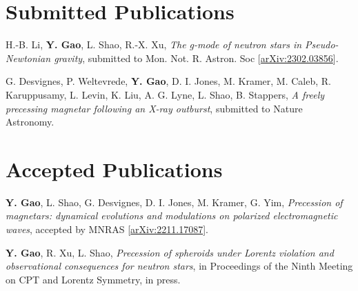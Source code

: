 \newcommand{\arxiv}[1]{[\href{http://arxiv.org/abs/#1}{arXiv:#1}]}
\newcommand{\citeCount}[1]{(#1 citations)}
\renewcommand{\citeCount}[1]{}


\setcounter{numPubs}{15}
\setcounter{pubCounter}{\value{numPubs}}

\section{\sc Submitted Publications}

\begin{etaremune}[start=\value{pubCounter}]
  \item
  H.-B. Li, 
  {\bf Y. Gao}, 
  L. Shao, 
  R.-X. Xu, 
  {\it The g-mode of neutron stars in Pseudo-Newtonian gravity}, 
  submitted to Mon. Not. R. Astron. Soc
  \arxiv{2302.03856}.
  \item
  G. Desvignes, 
  P. Weltevrede, 
  {\bf Y. Gao}, 
  D. I. Jones, 
  M. Kramer, 
  M. Caleb, 
  R. Karuppusamy, 
  L. Levin, 
  K. Liu, 
  A. G. Lyne, 
  L. Shao, 
  B. Stappers, 
  {\it A freely precessing magnetar following an X-ray outburst}, 
  submitted to Nature Astronomy.
\end{etaremune}

\section{\sc Accepted Publications}
\addtocounter{pubCounter}{-2}
\begin{etaremune}[start=\value{pubCounter}]
  \item  
  {\bf Y. Gao},
  L. Shao,
  G. Desvignes,
  D. I. Jones,
  M. Kramer,
  G. Yim,
  {\it Precession of magnetars: dynamical evolutions and modulations on polarized electromagnetic waves},
  accepted by MNRAS
  \arxiv{2211.17087}.
  \item 
  {\bf Y. Gao}, 
  R. Xu, 
  L. Shao, 
  {\it Precession of spheroids under Lorentz violation and observational consequences for neutron stars}, 
  in Proceedings of the Ninth Meeting on CPT and Lorentz Symmetry, in press.
  \setcounter{pubCounter}{\value{enumi}}
\end{etaremune}


